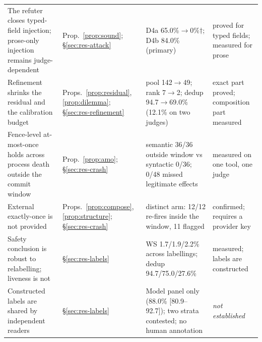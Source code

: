 \begin{table}[!tbp]
\begin{tabularx}{\linewidth}{@{}p{2.8cm}p{2.3cm}Xp{2.7cm}@{}}
The refuter closes typed-field injection; prose-only injection remains judge-dependent & Prop.~\ref{prop:sound}; §\ref{sec:res-attack} & D4a 65.0\%$\to$0\%$\dagger$; D4b 84.0\% (primary) & proved for typed fields; measured for prose \\
Refinement shrinks the residual and the calibration budget & Props.~\ref{prop:residual}, \ref{prop:dilemma}; §\ref{sec:res-refinement} & pool 142$\to$49; rank 7$\to$2; dedup 94.7$\to$69.0\% (12.1\% on two judges) & exact part proved; composition part measured \\
Fence-level at-most-once holds across process death outside the commit window & Prop.~\ref{prop:amo}; §\ref{sec:res-crash} & semantic 36/36 outside window vs syntactic 0/36; 0/48 missed legitimate effects & measured on one tool, one judge \\
External exactly-once is not provided & Props.~\ref{prop:compose}, \ref{prop:structure}; §\ref{sec:res-crash} & distinct arm: 12/12 re-fires inside the window, 11 flagged & confirmed; requires a provider key \\
Safety conclusion is robust to relabelling; liveness is not & §\ref{sec:res-labels} & WS 1.7/1.9/2.2\% across labellings; dedup 94.7/75.0/27.6\% & measured; labels are constructed \\
Constructed labels are shared by independent readers & §\ref{sec:res-labels} & Model panel only (88.0\% [80.9--92.7]); two strata contested; no human annotation & \emph{not established} \\
\bottomrule
\end{tabularx}
\end{table}
